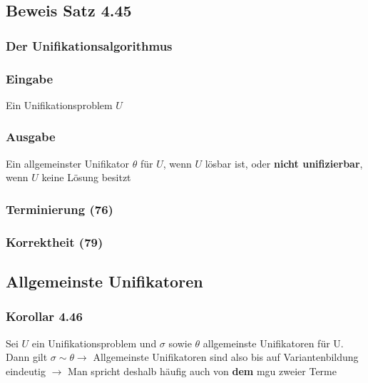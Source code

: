 \subsection{Beweis Satz 4.45}
\subsubsection{Der Unifikationsalgorithmus}
\subsubsection{Eingabe}
Ein Unifikationsproblem \(U\)
\subsubsection{Ausgabe}
Ein allgemeinster Unifikator \(\theta\) für \(U\), wenn \(U\) lösbar ist, oder \textbf{nicht unifizierbar}, wenn \(U\) keine Lösung besitzt
\subsubsection{Terminierung (76)}
\subsubsection{Korrektheit (79)}
\subsection{Allgemeinste Unifikatoren}
\subsubsection{Korollar 4.46}
Sei \(U\) ein Unifikationsproblem und \(\sigma\) sowie \(\theta\) allgemeinste Unifikatoren für U. Dann gilt \(\sigma \sim \theta \to \) Allgemeinste Unifikatoren sind also bis auf Variantenbildung eindeutig \(\to\) Man spricht deshalb häufig auch von \textbf{dem} mgu zweier Terme
